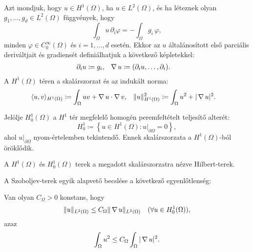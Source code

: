 \begin{definition}
	Azt mondjuk, hogy  $u \in H^1(\Omega)$, ha $u \in L^2(\Omega)$, és ha léteznek olyan $g_1, \ldots, g_d \in L^2(\Omega)$ függvények, hogy 
	\begin{equation*}
		\int_{\Omega} u  \, \partial_i \varphi = - \int_{\Omega} g_i \, \varphi ,
	\end{equation*}
	minden $\varphi \in C_0^{\infty}(\Omega)$ és $i = 1, \ldots, d$ esetén.
	Ekkor az $u$ általánosított első parciális deriváltjait és gradiensét definiálhatjuk a következő képletekkel: 
	\begin{align*}
		\partial_i u &\coloneqq g_i, &
		\operatorname{\nabla} u &\coloneqq  (\partial_i u, \ldots, \partial_i).
	\end{align*}
	A $H^1(\Omega)$ téren a skalárszorzat és az indukált norma:
	\begin{align*}
		\langle u, v \rangle_{H^1(\Omega)} &\coloneqq \int_{\Omega} uv + \operatorname{\nabla} u \cdot \operatorname{\nabla} v,&  
		\| u \|_{H^1(\Omega)}^2 &\coloneqq \int_{\Omega} u^2 + |\operatorname{\nabla} u|^2.
	\end{align*}
\end{definition}


\begin{definition}
	Jelölje $H^1_0(\Omega)$ a $H^1$ tér megfelelő homogén peremfeltételt teljesítő alterét:
	\begin{equation*}
		H_0^1 \coloneqq \left\{u \in H^1(\Omega) : u|_{\partial\Omega} = 0 \right\},
	\end{equation*}
	ahol $ u|_{\partial\Omega}$ nyom-értelemben tekintendő. Ennek skalárszorzata a $H^1(\Omega)$-ból öröklődik.
\end{definition}


\begin{statement}
	A $H^1(\Omega)$ és  $H^1_0(\Omega)$ terek a megadott skalárszorzatra nézve Hilbert-terek.
\end{statement}

A Szoboljev-terek egyik alapvető becslése a következő egyenlőtlenség:

\begin{statement}\label{poin-fried}
	Van olyan $C_{\Omega} > 0$ konstans, hogy
	\begin{equation*}
		\| u \|_{L^2(\Omega)} \leq C_{\Omega} \| \operatorname{\nabla} u \|_{L^2(\Omega)} \quad (\forall u \in H^1_0(\Omega)),
	\end{equation*}
	azaz
	\begin{equation*}
		\int_{\Omega} u^2 \leq  C_{\Omega} \int_{\Omega} | \operatorname{\nabla} u |^2.
	\end{equation*}
\end{statement}
	

